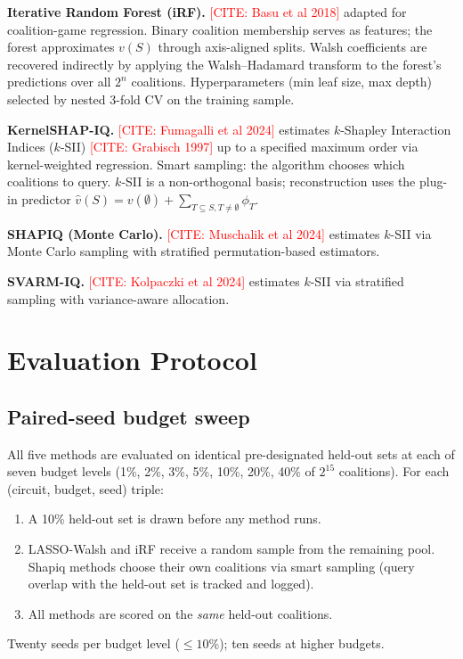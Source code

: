\documentclass[11pt]{article}
\newcommand{\citeneeded}[1]{\textcolor{red}{[CITE: #1]}}
\begin{document}
\textbf{Iterative Random Forest (iRF).}
\citeneeded{Basu et al 2018} adapted for coalition-game regression.
Binary coalition membership serves as features; the forest approximates
$v(S)$ through axis-aligned splits. Walsh coefficients are recovered
indirectly by applying the Walsh--Hadamard transform to the forest's
predictions over all $2^n$ coalitions. Hyperparameters (min leaf size,
max depth) selected by nested 3-fold CV on the training sample.

\textbf{KernelSHAP-IQ.}
\citeneeded{Fumagalli et al 2024} estimates $k$-Shapley Interaction
Indices ($k$-SII) \citeneeded{Grabisch 1997} up to a specified maximum
order via kernel-weighted regression. Smart sampling: the algorithm
chooses which coalitions to query. $k$-SII is a non-orthogonal basis;
reconstruction uses the plug-in predictor
$\hat{v}(S) = v(\emptyset) + \sum_{T \subseteq S, T \neq \emptyset} \phi_T$.

\textbf{SHAPIQ (Monte Carlo).}
\citeneeded{Muschalik et al 2024} estimates $k$-SII via Monte Carlo
sampling with stratified permutation-based estimators.

\textbf{SVARM-IQ.}
\citeneeded{Kolpaczki et al 2024} estimates $k$-SII via stratified
sampling with variance-aware allocation.


\section{Evaluation Protocol}
\label{sec:protocol}

\subsection{Paired-seed budget sweep}

All five methods are evaluated on identical pre-designated held-out sets
at each of seven budget levels (1\%, 2\%, 3\%, 5\%, 10\%, 20\%, 40\%
of $2^{15}$ coalitions). For each (circuit, budget, seed) triple:
%
\begin{enumerate}
\item A 10\% held-out set is drawn before any method runs.
\item LASSO-Walsh and iRF receive a random sample from the remaining
      pool. Shapiq methods choose their own coalitions via smart sampling
      (query overlap with the held-out set is tracked and logged).
\item All methods are scored on the \emph{same} held-out coalitions.
\end{enumerate}
%
Twenty seeds per budget level ($\leq 10\%$); ten seeds at higher budgets.
\end{document}
